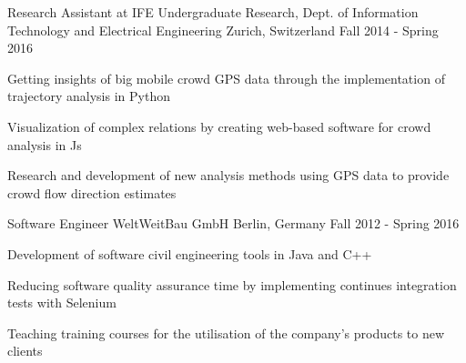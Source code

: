 \begin{cventries}
  \cventry
    {Research Assistant at IFE} %
    {Undergraduate Research, Dept. of Information Technology and Electrical Engineering} %
    {Zurich, Switzerland} %
    {Fall 2014 - Spring 2016} %
    {
      \begin{cvitems} %
        \item {Getting insights of big mobile crowd GPS data through the implementation of trajectory analysis in Python}
        \item {Visualization of complex relations by creating web-based software for crowd analysis in Js}
        \item {Research and development of new analysis methods using GPS data to provide crowd flow direction estimates}
      \end{cvitems}
    }

  \cventry
    {Software Engineer} %
    {WeltWeitBau GmbH} %
    {Berlin, Germany} %
    {Fall 2012 - Spring 2016} %
    {
      \begin{cvitems} %
        \item {Development of software civil engineering tools in Java and C++}
        \item {Reducing software quality assurance time by implementing continues integration tests with Selenium}
        \item {Teaching training courses for the utilisation of the company's products to new clients}
      \end{cvitems}
    }


\end{cventries}
